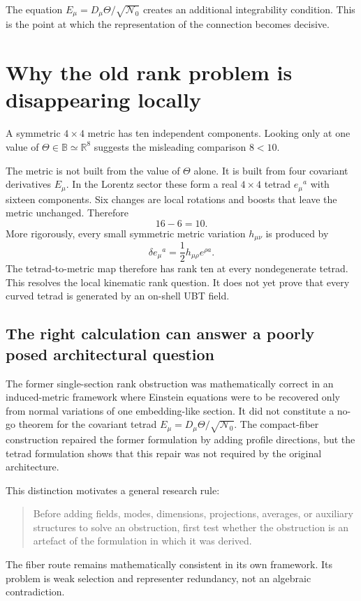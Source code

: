 The equation $E_\mu=D_\mu\Theta/\sqrt{\mathcal N_0}$ creates an additional
integrability condition.  This is the point at which the representation of the
connection becomes decisive.

\section{Why the old rank problem is disappearing locally}
A symmetric $4\times4$ metric has ten independent components.  Looking only at
one value of $\Theta\in\mathbb B\simeq\mathbb R^8$ suggests the misleading
comparison $8<10$.

The metric is not built from the value of $\Theta$ alone.  It is built from four
covariant derivatives $E_\mu$.  In the Lorentz sector these form a real
$4\times4$ tetrad $e_\mu{}^a$ with sixteen components.  Six changes are local
rotations and boosts that leave the metric unchanged.  Therefore
\[
 16-6=10.
\]
More rigorously, every small symmetric metric variation $h_{\mu\nu}$ is
produced by
\[
 \delta e_\mu{}^a=\frac12 h_{\mu\rho}e^{\rho a}.
\]
The tetrad-to-metric map therefore has rank ten at every nondegenerate tetrad.
This resolves the local kinematic rank question.  It does not yet prove that
every curved tetrad is generated by an on-shell UBT field.

\subsection{The right calculation can answer a poorly posed architectural question}
The former single-section rank obstruction was mathematically correct in an
induced-metric framework where Einstein equations were to be recovered only
from normal variations of one embedding-like section.  It did not constitute a
no-go theorem for the covariant tetrad $E_\mu=D_\mu\Theta/\sqrt{\mathcal N_0}$.
The compact-fiber construction repaired the former formulation by adding
profile directions, but the tetrad formulation shows that this repair was not
required by the original architecture.

This distinction motivates a general research rule:

\begin{quote}
Before adding fields, modes, dimensions, projections, averages, or auxiliary
structures to solve an obstruction, first test whether the obstruction is an
artefact of the formulation in which it was derived.
\end{quote}

The fiber route remains mathematically consistent in its own framework.  Its
problem is weak selection and representer redundancy, not an algebraic
contradiction.

